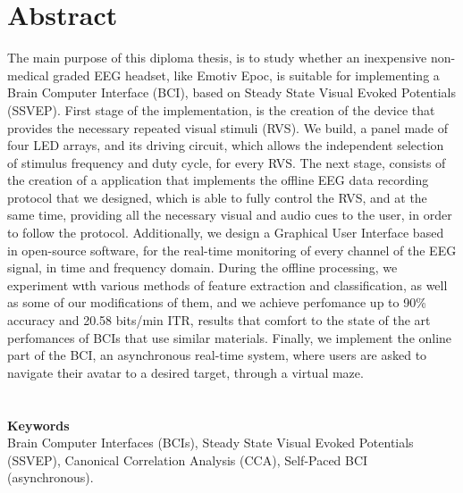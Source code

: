  \chapter{Abstract}
\par
 The main purpose of this diploma thesis, is to study whether an inexpensive non-medical graded EEG headset, like Emotiv Epoc, is suitable for implementing a Brain Computer Interface (BCI), based on Steady State Visual Evoked Potentials (SSVEP). First stage of the implementation, is the creation of the device that provides the necessary repeated visual stimuli (RVS). We build, a panel made of four LED arrays, and its driving circuit, which allows the independent selection of stimulus frequency and duty cycle, for every RVS. The next stage, consists of the creation of a application that implements the offline EEG data recording protocol that we designed, which is able to fully control the RVS, and at the same time, providing all the necessary visual and audio cues to the user, in order to follow the protocol. Additionally, we design a Graphical User Interface based in open-source software, for the real-time monitoring of every channel of the EEG signal, in time and frequency domain. During the offline processing, we experiment wιth various methods of feature extraction and classification, as well as some of our modifications of them, and we achieve perfomance up to 90\% accuracy and 20.58 bits/min ITR, results that comfort to the state of the art perfomances of BCIs that use similar materials. Finally, we implement the online part of the BCI, an asynchronous real-time system, where users are asked to navigate their avatar to a desired target, through a virtual maze.
 \\\\\\
 \large{\textbf{Keywords}}\\
Brain Computer Interfaces (BCIs), Steady State Visual Evoked Potentials (SSVEP), Canonical Correlation Analysis (CCA), Self-Paced BCI (asynchronous).
 \clearpage  %

